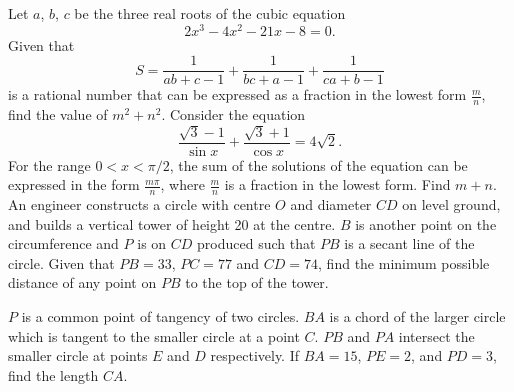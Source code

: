 \begin{enumerate}
    \begin{center}
    \end{center}
    \hyperrefitem[A::2024-S-1-14] Let $a$, $b$, $c$ be the three real roots of the cubic equation \[2x^3 - 4x^2 - 21x - 8 = 0.\] Given that \[S = \frac1{ab + c -1} + \frac1{bc + a -1} + \frac1{ca + b - 1}\] is a rational number that can be expressed as a fraction in the lowest form $\frac{m}{n}$, find the value of $m^2 + n^2$.
    \hyperrefitem[A::2024-S-1-15] Consider the equation \[\frac{\sqrt3 - 1}{\sin x} + \frac{\sqrt3 + 1}{\cos x} = 4\sqrt2.\] For the range $0 < x < \pi/2$, the sum of the solutions of the equation can be expressed in the form $\frac{m\pi}{n}$, where $\frac{m}{n}$ is a fraction in the lowest form. Find $m + n$.
    \hyperrefitem[A::2024-S-1-16] An engineer constructs a circle with centre $O$ and diameter $CD$ on level ground, and builds a vertical tower of height 20 at the centre. $B$ is another point on the circumference and $P$ is on $CD$ produced such that $PB$ is a secant line of the circle. Given that $PB = 33$, $PC = 77$ and $CD = 74$, find the minimum possible distance of any point on $PB$ to the top of the tower.

    \begin{center}
    \end{center}
    \hyperrefitem[A::2024-S-1-17] $P$ is a common point of tangency of two circles. $BA$ is a chord of the larger circle which is tangent to the smaller circle at a point $C$. $PB$ and $PA$ intersect the smaller circle at points $E$ and $D$ respectively. If $BA = 15$, $PE = 2$, and $PD = 3$, find the length $CA$.


\end{enumerate}
